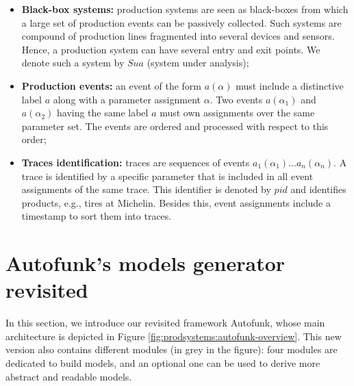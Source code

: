 \begin{itemize}
    \item \textbf{Black-box systems:} production systems are seen as
        black-boxes from which a large set of production events can
        be passively collected. Such systems are compound of
        production lines fragmented into several devices and sensors.
        Hence, a production system can have several entry and exit
        points. We denote such a system by $\mathit{Sua}$ (system
        under analysis);

    \item \textbf{Production events:} an event of the form
        $a(\alpha)$ must include a distinctive label $a$ along with a
        parameter assignment $\alpha$. Two events $a(\alpha_1)$ and
        $a(\alpha_2)$ having the same label $a$ must own assignments
        over the same parameter set. The events are ordered and
        processed with respect to this order;

    \item \textbf{Traces identification:} traces are sequences of events
        $a_1(\alpha_1)$...$a_n(\alpha_n)$. A trace is identified by a
        specific parameter that is included in all event assignments
        of the same trace. This identifier is denoted by $pid$ and
        identifies products, e.g., tires at Michelin.  Besides this,
        event assignments include a timestamp to sort them into
        traces.
\end{itemize}


\section{Autofunk's models generator revisited}
\label{sec:modelinf:prodsystems:autofunk}

In this section, we introduce our revisited framework Autofunk,
whose main architecture is depicted in Figure
\ref{fig:prodsystems:autofunk-overview}. This new version also
contains different modules (in grey in the figure): four modules
are dedicated to build models, and an optional one can be used to
derive more abstract and readable models.

